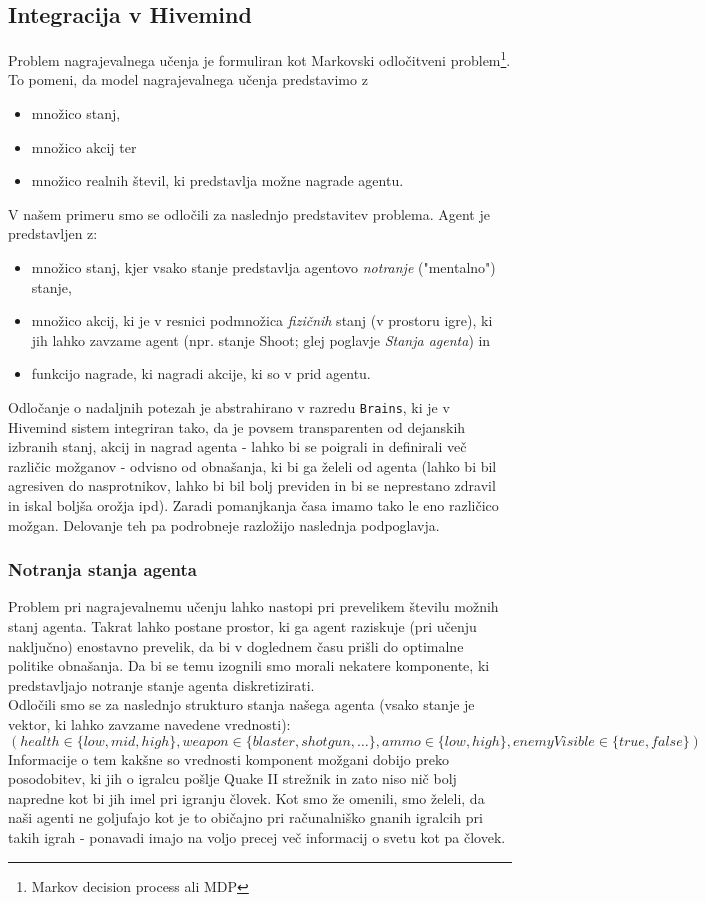 \documentclass[a4paper,10pt]{article}
\begin{document}
\subsection{Integracija v Hivemind}
Problem nagrajevalnega učenja je formuliran kot Markovski odločitveni problem\footnote{Markov decision process ali MDP}. To pomeni, da model nagrajevalnega učenja
predstavimo z
\begin{itemize}
 \item množico stanj,
 \item množico akcij ter
 \item množico realnih števil, ki predstavlja možne nagrade agentu.
\end{itemize}
V našem primeru smo se odločili za naslednjo predstavitev problema. Agent je predstavljen z:
\begin{itemize}
 \item množico stanj, kjer vsako stanje predstavlja agentovo \textit{notranje} ("mentalno") stanje,
 \item množico akcij, ki je v resnici podmnožica \textit{fizičnih} stanj (v prostoru igre), ki jih lahko zavzame agent (npr. stanje Shoot; glej poglavje \textit{Stanja agenta}) in
 \item funkcijo nagrade, ki nagradi akcije, ki so v prid agentu.
\end{itemize}
Odločanje o nadaljnih potezah je abstrahirano v razredu \verb+Brains+, ki je v Hivemind sistem integriran tako, da je povsem transparenten od dejanskih izbranih 
stanj, akcij in nagrad agenta - lahko bi se poigrali in definirali več različic možganov - odvisno od obnašanja, ki bi ga želeli od agenta 
(lahko bi bil agresiven do nasprotnikov, lahko bi bil bolj previden in bi se neprestano zdravil in iskal boljša orožja ipd). Zaradi pomanjkanja časa imamo 
tako le eno različico možgan. Delovanje teh pa podrobneje razložijo naslednja podpoglavja.

\subsubsection{Notranja stanja agenta}
Problem pri nagrajevalnemu učenju lahko nastopi pri prevelikem številu možnih stanj agenta. Takrat lahko postane prostor, ki ga agent raziskuje 
(pri učenju naključno) enostavno prevelik, da bi v doglednem času prišli do optimalne politike obnašanja. Da bi se temu izognili smo morali nekatere 
komponente, ki predstavljajo notranje stanje agenta diskretizirati.\\
Odločili smo se za naslednjo strukturo stanja našega agenta (vsako stanje je vektor, ki lahko zavzame navedene vrednosti):
$$(health \in \{low, mid, high\}, weapon \in \{blaster, shotgun, \ldots\}, ammo \in \{low, high\}, enemyVisible \in \{true, false\})$$
Informacije o tem kakšne so vrednosti komponent možgani dobijo preko posodobitev, ki jih o igralcu pošlje Quake II strežnik in zato niso
nič bolj napredne kot bi jih imel pri igranju človek. Kot smo že omenili, smo želeli, da naši agenti ne goljufajo kot je to običajno pri računalniško
gnanih igralcih pri takih igrah - ponavadi imajo na voljo precej več informacij o svetu kot pa človek.
\end{document}
